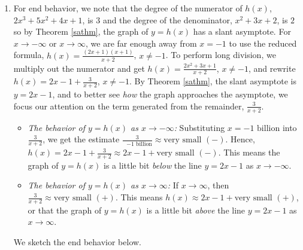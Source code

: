 \documentclass{ximera}
\begin{document}
\begin{example}
\begin{enumerate}
\item  For end behavior, we note that the degree of the numerator of $h(x)$, $2x^3+5x^2+4x+1$, is $3$ and the degree of the denominator, $x^2+3x+2$, is $2$ so by Theorem \ref{sathm}, the graph of $y = h(x)$ has a slant asymptote.  For $x\rightarrow  -\infty$ or $x \rightarrow \infty$, we are far enough away from $x=-1$ to use the reduced formula, $h(x) = \frac{(2x+1)(x+1)}{x+2}$, $x \neq -1$.  To perform long division, we multiply out the numerator and get $h(x) = \frac{2x^2+3x+1}{x+2}$, $x \neq -1$, and rewrite $h(x) = 2x-1+\frac{3}{x+2}$, $x \neq -1$.  By Theorem \ref{sathm}, the slant asymptote is $y = 2x-1$, and to better see \textit{how} the graph approaches the asymptote, we focus our attention on the term generated from the remainder, $\frac{3}{x+2}$.

\begin{itemize}

\item  \textit{The behavior of $y=h(x)$ as $x \rightarrow -\infty$:} Substituting  $x = \text{$-1$ billion}$ into $\frac{3}{x+2}$, we get the estimate $\frac{3}{\text{ $-1$ billion}} \approx \text{very small $(-)$}$.  Hence, $h(x) = 2x-1+\frac{3}{x+2} \approx 2x-1 + \text{very small $(-)$}$.  This means the graph of $y=h(x)$ is a little bit \textit{below} the line $y=2x-1$ as $x \rightarrow -\infty$.

\item  \textit{The behavior of $y=h(x)$ as $x \rightarrow \infty$:}  If $x \rightarrow \infty$, then $\frac{3}{x+2} \approx \text{very small $(+)$}$.  This means $h(x) \approx 2x-1 + \text{very small $(+)$}$, or that the graph of $y=h(x)$ is a little bit \textit{above} the line $y=2x-1$ as $x \rightarrow \infty$.

\end{itemize}

We sketch the end behavior below.
 






\begin{image}
\end{image}
\end{enumerate}
\end{example}
\end{document}
